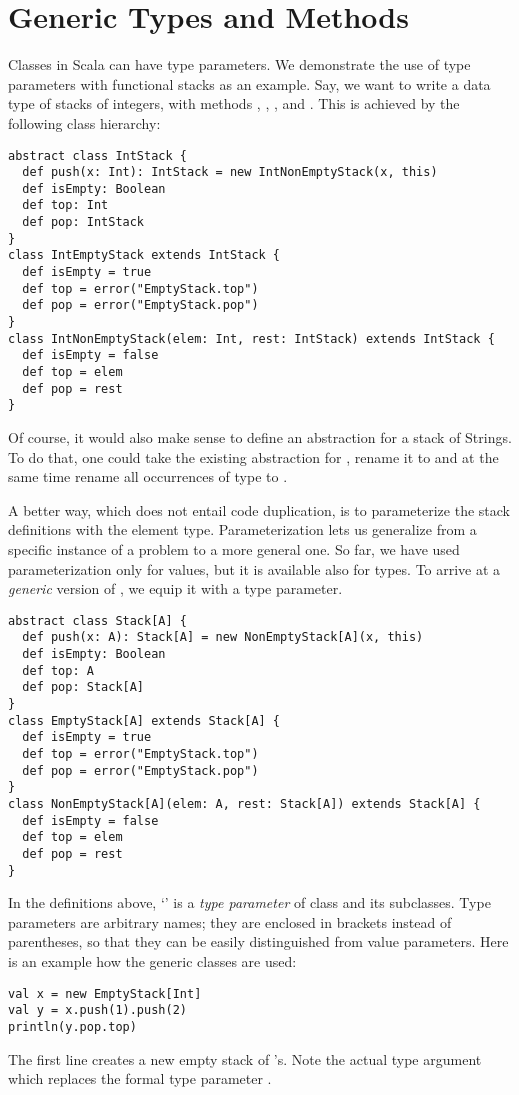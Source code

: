 \chapter{Generic Types and Methods}

Classes in Scala can have type parameters. We demonstrate the use of
type parameters with functional stacks as an example. Say, we want to
write a data type of stacks of integers, with methods ,
, , and . This is achieved by the
following class hierarchy:
\begin{lstlisting}
abstract class IntStack {
  def push(x: Int): IntStack = new IntNonEmptyStack(x, this)
  def isEmpty: Boolean
  def top: Int
  def pop: IntStack
}
class IntEmptyStack extends IntStack {
  def isEmpty = true
  def top = error("EmptyStack.top")
  def pop = error("EmptyStack.pop")
}
class IntNonEmptyStack(elem: Int, rest: IntStack) extends IntStack {
  def isEmpty = false
  def top = elem
  def pop = rest
}
\end{lstlisting}
Of course, it would also make sense to define an abstraction for a
stack of Strings. To do that, one could take the existing abstraction
for , rename it to  and at the same
time rename all occurrences of type  to .

A better way, which does not entail code duplication, is to
parameterize the stack definitions with the element type.
Parameterization lets us generalize from a specific instance of a
problem to a more general one. So far, we have used parameterization
only for values, but it is available also for types. To arrive at a
{\em generic} version of , we equip it with a type
parameter.
\begin{lstlisting}
abstract class Stack[A] {
  def push(x: A): Stack[A] = new NonEmptyStack[A](x, this)
  def isEmpty: Boolean
  def top: A
  def pop: Stack[A]
}
class EmptyStack[A] extends Stack[A] {
  def isEmpty = true
  def top = error("EmptyStack.top")
  def pop = error("EmptyStack.pop")
}
class NonEmptyStack[A](elem: A, rest: Stack[A]) extends Stack[A] {
  def isEmpty = false
  def top = elem
  def pop = rest
}
\end{lstlisting}
In the definitions above, `' is a {\em type parameter} of
class  and its subclasses.  Type parameters are arbitrary
names; they are enclosed in brackets instead of parentheses, so that
they can be easily distinguished from value parameters.  Here is an
example how the generic classes are used:
\begin{lstlisting}
val x = new EmptyStack[Int]
val y = x.push(1).push(2)
println(y.pop.top)
\end{lstlisting}
The first line creates a new empty stack of 's. Note the
actual type argument \code{[Int]} which replaces the formal type
parameter .


